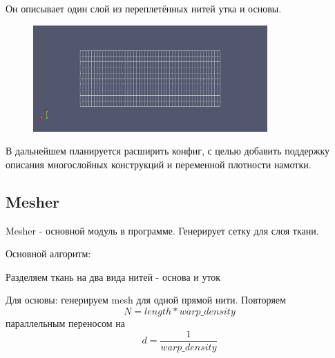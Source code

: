 Он описывает один слой из переплетённых нитей утка и основы.

\begin{figure}[H]
    \includegraphics[width=0.8\textwidth]{img/scheme.png}
    \centering
\end{figure}

В дальнейшем планируется расширить конфиг, с целью добавить поддержку описания многослойных конструкций
и переменной плотности намотки.

\subsection*{Mesher}
Mesher - основной модуль в программе.
Генерирует сетку для слоя ткани.

Основной алгоритм:

Разделяем ткань на два вида нитей - основа и уток

Для основы: генерируем mesh для одной прямой нити.
Повторяем
\[
    N = length * warp\_density
\]
параллельным переносом на
\[
    d = \frac{1}{warp\_density}
\]


